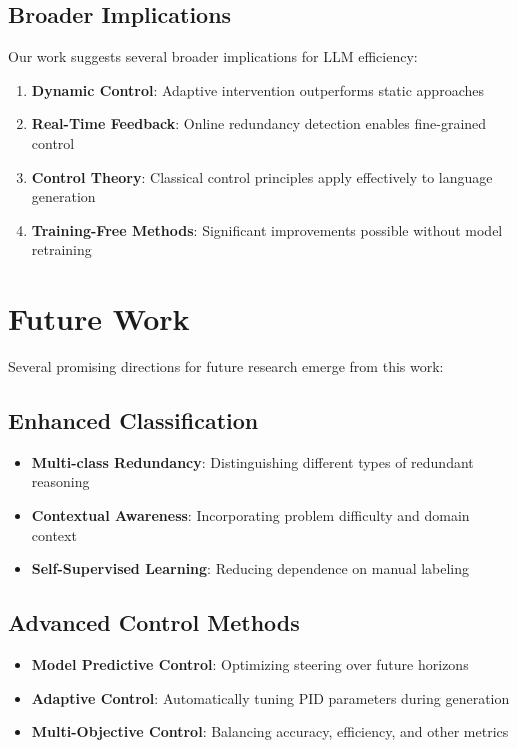 \documentclass{article}
\begin{document}
\subsection{Broader Implications}

Our work suggests several broader implications for LLM efficiency:

\begin{enumerate}
\item \textbf{Dynamic Control}: Adaptive intervention outperforms static approaches
\item \textbf{Real-Time Feedback}: Online redundancy detection enables fine-grained control
\item \textbf{Control Theory}: Classical control principles apply effectively to language generation
\item \textbf{Training-Free Methods}: Significant improvements possible without model retraining
\end{enumerate}

\section{Future Work}

Several promising directions for future research emerge from this work:

\subsection{Enhanced Classification}

\begin{itemize}
\item \textbf{Multi-class Redundancy}: Distinguishing different types of redundant reasoning
\item \textbf{Contextual Awareness}: Incorporating problem difficulty and domain context
\item \textbf{Self-Supervised Learning}: Reducing dependence on manual labeling
\end{itemize}

\subsection{Advanced Control Methods}

\begin{itemize}
\item \textbf{Model Predictive Control}: Optimizing steering over future horizons
\item \textbf{Adaptive Control}: Automatically tuning PID parameters during generation
\item \textbf{Multi-Objective Control}: Balancing accuracy, efficiency, and other metrics
\end{itemize}
\end{document}
